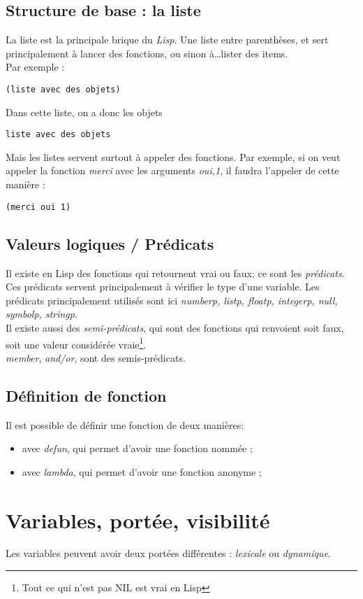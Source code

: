 \documentclass{report}
\begin{document}
\subsection{Structure de base : la liste}
La liste est la principale brique du \emph{Lisp}.
Une liste entre parenthèses, et sert principalement à lancer des fonctions, ou sinon à\ldots lister des items.\\
Par exemple :
\begin{verbatim}
(liste avec des objets)
\end{verbatim}
Dans cette liste, on a donc les objets
\begin{verbatim}
liste avec des objets
\end{verbatim}
Mais les listes servent surtout à appeler des fonctions.
Par exemple, si on veut appeler la fonction \emph{merci} avec les arguments \emph{oui,1}, il faudra l'appeler de cette manière :
\begin{verbatim}
(merci oui 1)
\end{verbatim} 

\subsection{Valeurs logiques / Prédicats}
Il existe en Lisp des fonctions qui retournent vrai ou faux; ce sont les \emph{prédicats}.
Ces prédicats servent principalement à vérifier le type d'une variable.
Les prédicats principalement utilisés sont ici \emph{numberp, listp, floatp, integerp, null, symbolp, stringp}.\\
Il existe aussi des \emph{semi-prédicats}, qui sont des fonctions qui renvoient soit faux, soit une valeur considérée vraie\footnote{Tout ce qui n'est pas NIL est vrai en Lisp}.\\
\emph{member}, \emph{and/or}, sont des semis-prédicats.

\subsection{Définition de fonction}
Il est possible de définir une fonction de deux manières:
\begin{itemize}
\item{avec \emph{defun}, qui permet d'avoir une fonction nommée ;}
\item{avec \emph{lambda}, qui permet d'avoir une fonction anonyme ;}
\end{itemize}

\section{Variables, portée, visibilité}
Les variables peuvent avoir deux portées différentes : \emph{lexicale} ou \emph{dynamique}.
\end{document}

